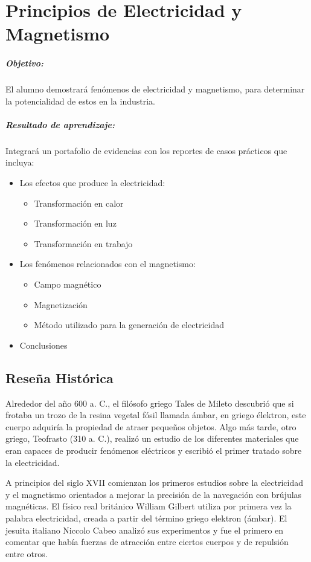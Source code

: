 \chapter{Principios de Electricidad y Magnetismo}
\paragraph{Objetivo:}
El alumno demostrará fenómenos de electricidad y magnetismo,
para determinar la potencialidad de estos en la industria.

\paragraph{Resultado de aprendizaje:}
Integrará un portafolio de evidencias con los reportes de casos prácticos que incluya: 
\begin{itemize}
	\item Los efectos que produce la electricidad:
	\begin{itemize}
		\item Transformación en calor
		\item Transformación en luz
		\item Transformación en trabajo
	\end{itemize}
	\item Los fenómenos relacionados con el magnetismo:
	\begin{itemize}
		\item Campo magnético
		\item Magnetización
		\item Método utilizado para la generación de electricidad
	\end{itemize}
	\item Conclusiones
\end{itemize}
 
\section{Reseña Histórica}
Alrededor del año 600 a. C., el filósofo griego Tales de Mileto descubrió que si frotaba un trozo de la resina vegetal fósil llamada ámbar, en griego élektron, este cuerpo adquiría la propiedad de atraer pequeños objetos. Algo más tarde, otro griego, Teofrasto (310 a. C.), realizó un estudio de los diferentes materiales que eran capaces de producir fenómenos eléctricos y escribió el primer tratado sobre la electricidad.

A principios del siglo XVII comienzan los primeros estudios sobre la electricidad y el magnetismo orientados a mejorar la precisión de la navegación con brújulas magnéticas. El físico real británico William Gilbert utiliza por primera vez la palabra electricidad, creada a partir del término griego elektron (ámbar). El jesuita italiano Niccolo Cabeo analizó sus experimentos y fue el primero en comentar que había fuerzas de atracción entre ciertos cuerpos y de repulsión entre otros.

